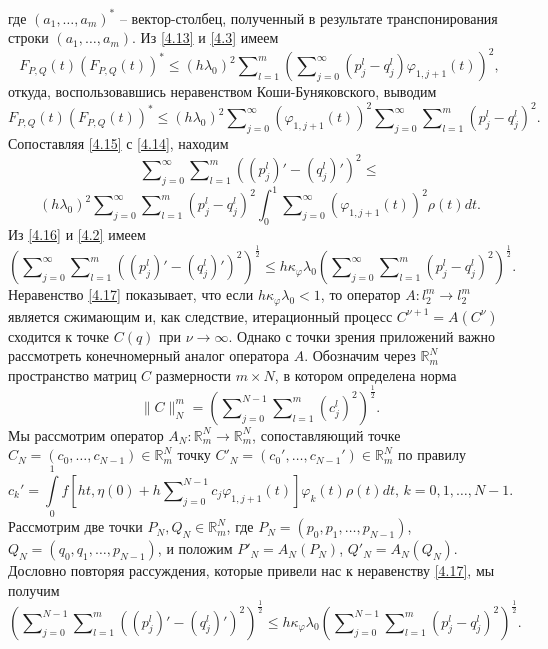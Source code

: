где $(a_1,\ldots,a_m)^*$ -- вектор-столбец, полученный в результате транспонирования строки $(a_1,\ldots,a_m)$.
Из \eqref{4.13} и \eqref{4.3}  имеем
$$
F_{P,Q}(t)(F_{P,Q}(t))^*\le (h\lambda_0)^2 \sum\nolimits_{l=1}^m  \left(\sum\nolimits_{j=0}^\infty( p^l_j-q^l_j)\varphi_{1,j+1}(t)\right)^2,
$$
откуда,  воспользовавшись неравенством Коши-Буняковского, выводим
\begin{equation}\label{4.15}
F_{P,Q}(t)(F_{P,Q}(t))^*\le(h\lambda_0)^2  \sum\nolimits_{j=0}^\infty(\varphi_{1,j+1}(t))^2 \sum\nolimits_{j=0}^\infty\sum\nolimits_{l=1}^m( p^l_j-q^l_j)^2.
\end{equation}
Сопоставляя \eqref{4.15} с \eqref{4.14}, находим
$$
\sum\nolimits_{j=0}^\infty\sum\nolimits_{l=1}^m((p^l_j)'-(q^l_j)')^2\le
$$
\begin{equation}\label{4.16}
(h\lambda_0)^2 \sum\nolimits_{j=0}^\infty\sum\nolimits_{l=1}^m( p^l_j-q^l_j)^2\int_{0}^1 \sum\nolimits_{j=0}^\infty(\varphi_{1,j+1}(t))^2\rho(t) dt.
\end{equation}
Из  \eqref{4.16}  и \eqref{4.2} имеем
\begin{equation}\label{4.17}
\left(\sum\nolimits_{j=0}^\infty\sum\nolimits_{l=1}^m((p^l_j)'-(q^l_j)')^2\right)^\frac12\le h\kappa_\varphi\lambda_0 \left(\sum\nolimits_{j=0}^\infty\sum\nolimits_{l=1}^m( p^l_j-q^l_j)^2\right)^\frac12.
\end{equation}
Неравенство \eqref{4.17} показывает, что если $h\kappa_\varphi\lambda_0<1$, то оператор  $A:l_2^m\to l_2^m$ является сжимающим и, как следствие, итерационный процесс $C^{\nu+1}=A(C^{\nu})$  сходится к точке $C(q)$ при $\nu\to\infty$. Однако с точки зрения приложений важно рассмотреть конечномерный аналог оператора $A$. Обозначим через $\mathbb{R}^N_m$ пространство матриц $C$ размерности $m\times N$, в котором определена норма
$$\|C\|_N^m=\left(\sum\nolimits_{j=0}^{N-1} \sum\nolimits_{l=1}^{m}(c_j^l)^2\right)^\frac12.$$
Мы рассмотрим оператор $A_N:\mathbb{R}^N_m\to \mathbb{R}^N_m$, сопоставляющий точке 
$C_N=(c_0,\ldots,c_{N-1})\in \mathbb{R}^N_m $ точку  $C'_N=(c_0',\ldots,c_{N-1}')\in \mathbb{R}^N_m $ по правилу
\begin{equation}\label{4.18}
c_k'=\int\limits_{0}^1f\left[ht,\eta(0)+ h\sum\nolimits_{j=0}^{N-1} c_j\varphi_{1,j+1}(t)\right]\varphi_k(t)\rho(t) dt,\,k=0,1,\ldots, N-1.
\end{equation}
Рассмотрим две точки $P_N,Q_N\in \mathbb{R}^N_m$, где $P_N=(p_0,p_1,\ldots,p_{N-1})$, $Q_N=(q_0,q_1,\ldots,p_{N-1})$, и положим $P'_N=A_N(P_N)$, $Q'_N=A_N(Q_N)$. Дословно повторяя рассуждения, которые привели нас к неравенству \eqref{4.17}, мы получим
\begin{equation}\label{4.19}
\left(\sum\nolimits_{j=0}^{N-1}\sum\nolimits_{l=1}^m((p^l_j)'-(q^l_j)')^2\right)^\frac12\le h\kappa_\varphi\lambda_0 \left(\sum\nolimits_{j=0}^{N-1}\sum\nolimits_{l=1}^m( p^l_j-q^l_j)^2\right)^\frac12.
\end{equation}

